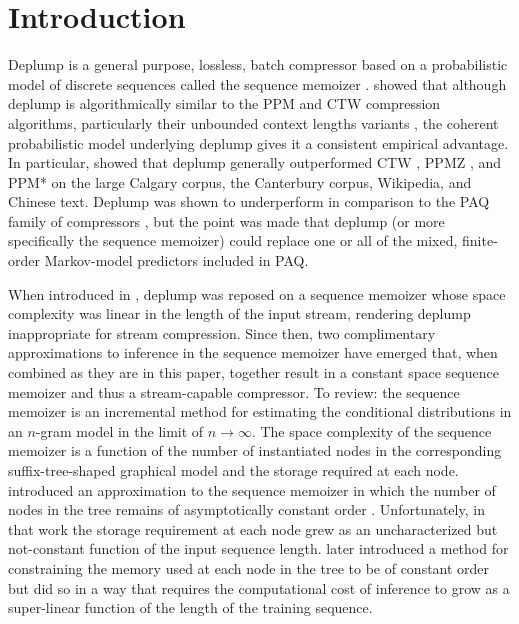 \section{Introduction}
\label{sec:introduction}

Deplump \citep{Gasthaus2010} is a general purpose, lossless, batch compressor based on a probabilistic model of discrete sequences called the sequence memoizer \citep{Wood2009}.   \citeauthor{Gasthaus2010} showed that although deplump is algorithmically similar to the PPM and CTW compression algorithms, particularly their unbounded context lengths variants \citep{Cleary1997,Willems1998}, the coherent probabilistic model underlying deplump gives it a consistent empirical advantage.  In particular, \citeauthor{Gasthaus2010} showed that deplump generally outperformed CTW  \citep{Willems2009}, PPMZ \citep{Peltola2002}, and PPM* \citep{Cleary1997} on the large Calgary corpus, the Canterbury corpus, Wikipedia, and Chinese text.  Deplump was shown to underperform in comparison to the PAQ family of compressors \citep{Mahoney2005}, but the point was made that deplump (or more specifically the sequence memoizer) could replace one or all of the mixed, finite-order Markov-model predictors included in PAQ.  

When introduced in \citep{Gasthaus2010}, deplump was reposed on a sequence memoizer \citep{Wood2009} whose space complexity was linear in the length of the input stream, rendering deplump inappropriate for stream compression.  Since then, two complimentary approximations to inference in the sequence memoizer have emerged that, when combined as they are in this paper, together result in a constant space sequence memoizer and thus a stream-capable compressor. To review: the sequence memoizer is an incremental method for estimating the conditional distributions in an $n$-gram model in the limit of $n\rightarrow\infty$.  The space complexity of the sequence memoizer is a function of the number of instantiated nodes in the corresponding suffix-tree-shaped graphical model and the storage required at each node. \citeauthor{Bartlett2010} introduced an approximation to the sequence memoizer in which the number of nodes in the tree remains of asymptotically constant order \citep{Bartlett2010}.  Unfortunately, in that work the storage requirement at each node grew as an uncharacterized but not-constant function of the input sequence length.  \citeauthor{Gasthaus2011} later introduced a method for constraining the memory used at each node in the tree to be of constant order  \citep{Gasthaus2011} but did so in a way that requires the computational cost of inference to grow as a super-linear function of the length of the training sequence.

